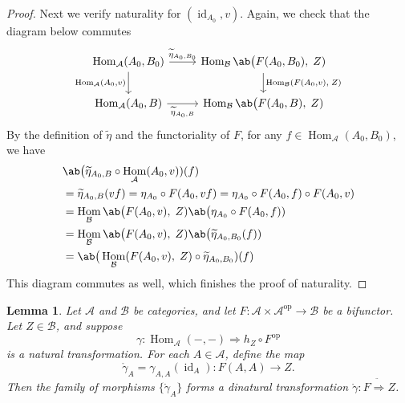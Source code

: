 \documentclass[12pt, english]{article}
\numberwithin{equation}{section}
\DeclareMathOperator{\Hom}{Hom}
\DeclareMathOperator{\id}{id}
\DeclareMathOperator{\opp}{op}
\theoremstyle{plain}
\newtheorem{lemma}{Lemma}[section]
\theoremstyle{definition}
\theoremstyle{remark}
\begin{document}
\begin{proof}
		Next we verify naturality for $ (\id_{A_0}, v)$. Again, we check that the diagram below commutes
		\[
		\begin{tikzcd}
			{\Hom_{\mathcal{A}}(A_0, B_0)} \arrow[r, "{\widetilde{\eta}_{A_0,B_0}}"] \arrow[d, "{\Hom_{\mathcal{A}}(A_0, v)  }"']
			& {\Hom_{\mathcal{B}} \ab\big(F(A_0, B_0), \; Z)} \arrow[d, "{\Hom_{\mathcal{B}}(F(A_0, v), \;  Z)}"] \\
			{ \Hom_{\mathcal{A}}(A_0, B) } \arrow[r, "{\widetilde{\eta}_{A_0, B}}"'] & \Hom_{\mathcal{B}} \ab\big(F(A_0, B), \; Z)
		\end{tikzcd}
		\]
		By the definition of $\widetilde{\eta}$ and the functoriality of $F$, for any $f \in \Hom_{\mathcal{A}}(A_0, B_0)$, we have
		\begin{align*}
			& \ab\big(\widetilde{\eta}_{A_0, B} \circ \Hom_{\mathcal{A}}(A_0, v)) (f) \\
			& = \widetilde{\eta}_{A_0, B} (vf) = \eta_{A_0} \circ F(A_0, vf) = \eta_{A_0} \circ F(A_0, f) \circ F(A_0, v) \\
			& = \Hom_{\mathcal{B}} \ab\big(F(A_0, v), \; Z) \ab\big(\eta_{A_0} \circ F(A_0, f)) \\
			& = \Hom_{\mathcal{B}} \ab\big(F(A_0, v), \; Z) \ab\big(\widetilde{\eta}_{A_0, B_0} (f)) \\
			& = \ab\big(\Hom_{\mathcal{B}}(F(A_0, v), \; Z) \circ \widetilde{\eta}_{A_0, B_0}) (f)
		\end{align*}
		This diagram commutes as well, which finishes the proof of naturality.
		
	\end{proof}
	
	\begin{lemma} \label{lem:natural-to-dinatural}
		Let $\mathcal{A}$ and $\mathcal{B}$ be categories, and let $F\colon\mathcal{A} \times\mathcal{A}^{\opp} \to \mathcal{B} $ be a bifunctor.
		Let $Z \in \mathcal{B}$, and suppose
		\[
		\gamma \colon \Hom_{\mathcal{A}}(-, -) \Rightarrow h_Z\circ F^{\opp}
		\]
		is a natural transformation. For each $A \in \mathcal{A}$,   define the map
		\begin{equation} \label{eq:diagonal-identity-evaluation}
			\mathring{\gamma}_A = \gamma_{A, A}(\id_A) \colon F(A, A) \longrightarrow Z.
		\end{equation}
		Then the family of morphisms  $\{\mathring{\gamma}_A\}$ forms a dinatural transformation
		$\mathring{\gamma} \colon F \ddot{ \Rightarrow } Z$.
		
	\end{lemma}
	
\end{document}
